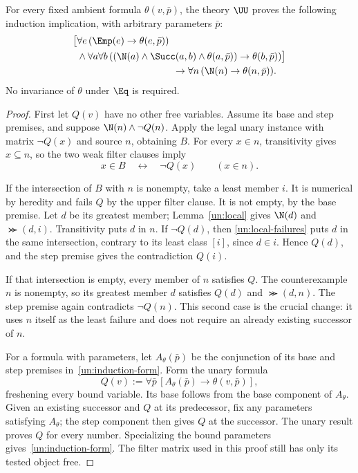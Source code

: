 \begin{theorem}
\label{un:induction}
For every fixed ambient formula $\theta(v,\bar p)$, the theory $\UU$
proves the following induction implication, with arbitrary parameters
$\bar p$:
\begin{equation}\label{un:induction-form}
\begin{split}
 \bigl[&\forall e\,(\Emp(e)\to\theta(e,\bar p))\\
 &\land\forall a\forall b\,
   ((\N(a)\land\Succ(a,b)\land\theta(a,\bar p))
                            \to\theta(b,\bar p))\bigr]\\
 &\hspace{35mm}\to\forall n\,(\N(n)\to\theta(n,\bar p)).
\end{split}
\end{equation}
No invariance of $\theta$ under $\Eq$ is required.
\end{theorem}
\begin{proof}
First let $Q(v)$ have no other free variables. Assume its base and step
premises, and suppose $\N(n)\land\neg Q(n)$. Apply the legal unary
instance with matrix $\neg Q(x)$ and source $n$, obtaining $B$. For
every $x\in n$, transitivity gives $x\subseteq n$, so the two weak
filter clauses imply
\begin{equation}\label{un:local-failures}
               x\in B\quad\longleftrightarrow\quad\neg Q(x)
                  \qquad(x\in n).
\end{equation}

If the intersection of $B$ with $n$ is nonempty, take a least member
$i$. It is numerical by heredity and fails $Q$ by the upper filter
clause. It is not empty, by the base premise. Let $d$ be its greatest
member; Lemma~\ref{un:local} gives $\N(d)$ and $\Succ(d,i)$.
Transitivity puts $d$ in $n$. If $\neg Q(d)$, then
\eqref{un:local-failures} puts $d$ in the same intersection, contrary
to its least class $[i]$, since $d\in i$. Hence $Q(d)$, and the step
premise gives the contradiction $Q(i)$.

If that intersection is empty, every member of $n$ satisfies $Q$.
The counterexample $n$ is nonempty, so its greatest member $d$ satisfies
$Q(d)$ and $\Succ(d,n)$. The step premise again contradicts $\neg Q(n)$.
This second case is the crucial change: it uses $n$ itself as the least
failure and does not require an already existing successor of $n$.

For a formula with parameters, let $A_\theta(\bar p)$ be the conjunction
of its base and step premises in~\eqref{un:induction-form}. Form the
unary formula
\[
 Q(v):=\forall\bar p\,[A_\theta(\bar p)\to\theta(v,\bar p)],
\]
freshening every bound variable. Its base follows from the base component
of $A_\theta$. Given an existing successor and $Q$ at its predecessor,
fix any parameters satisfying $A_\theta$; the step component then gives
$Q$ at the successor. The unary result proves $Q$ for every number.
Specializing the bound parameters gives~\eqref{un:induction-form}.
The filter matrix used in this proof still has only its tested object
free.
\end{proof}

